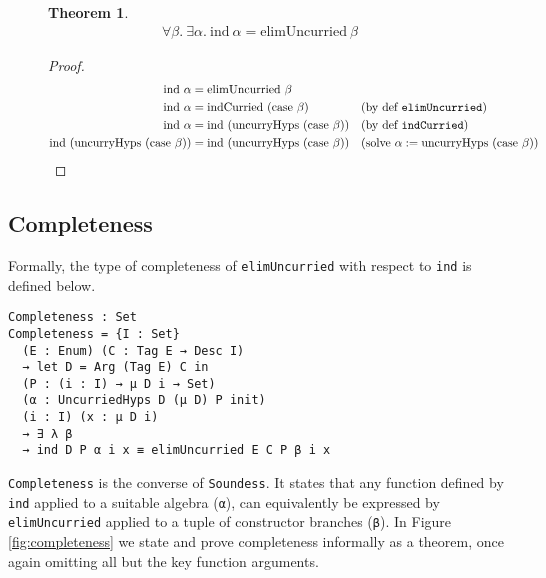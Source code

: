\documentclass[preprint,nonatbib]{sigplanconf}
\newtheorem*{mythm}{Theorem}
\newcommand{\reffig}[1]{Figure \ref{fig:#1}}
\begin{document}
\begin{figure*}
\caption{Soundness of {\tt elim}}
\label{fig:soundness}
\begin{mythm}
\begin{align*}
\forall \beta. ~ \exists \alpha.
~ \textrm{ind} ~ \alpha = \textrm{elimUncurried} ~ \beta
\end{align*}
\end{mythm}

\begin{proof}
\begin{align*}
\textrm{ind} ~ \alpha &= \textrm{elimUncurried} ~ \beta& && \\
\textrm{ind} ~ \alpha &=\textrm{indCurried} ~ ( \textrm{case} ~ \beta ) && \text{(by def {\tt elimUncurried})} \\
\textrm{ind} ~ \alpha &= \textrm{ind} ~ ( \textrm{uncurryHyps} ~ ( \textrm{case} ~ \beta ) ) && \text{(by def {\tt indCurried})} \\
\textrm{ind} ~ ( \textrm{uncurryHyps} ~ ( \textrm{case} ~ \beta ) ) &= \textrm{ind} ~ ( \textrm{uncurryHyps} ~ ( \textrm{case} ~ \beta ) ) && (\text{solve} ~ \alpha := \textrm{uncurryHyps} ~ ( \textrm{case} ~ \beta ))
\end{align*}
\end{proof}
\end{figure*}

\subsection{Completeness}

Formally, the type of completeness of {\tt elimUncurried} with respect to
{\tt ind} is defined below.

\begin{verbatim}
Completeness : Set
Completeness = {I : Set} 
  (E : Enum) (C : Tag E → Desc I)
  → let D = Arg (Tag E) C in
  (P : (i : I) → μ D i → Set)
  (α : UncurriedHyps D (μ D) P init)
  (i : I) (x : μ D i)
  → ∃ λ β
  → ind D P α i x ≡ elimUncurried E C P β i x
\end{verbatim}

{\tt Completeness} is the converse of {\tt Soundess}.
It states that any function defined by
{\tt ind} applied to a suitable algebra ({\tt α}), can equivalently be
expressed by {\tt elimUncurried} applied to a tuple of constructor branches
({\tt β}). In \reffig{completeness} we
state and prove completeness informally
as a theorem, once again omitting all but the key function arguments.
\end{document}
